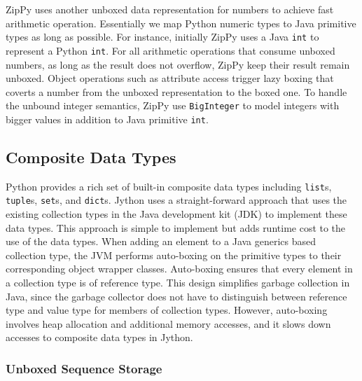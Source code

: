 ZipPy uses another unboxed data representation for numbers to achieve fast arithmetic operation.
Essentially we map Python numeric types to Java primitive types as long as possible.
For instance, initially ZipPy uses a Java \texttt{int} to represent a Python \texttt{int}.
For all arithmetic operations that consume unboxed numbers, as long as the result does not overflow, ZipPy keep their result remain unboxed.
Object operations such as attribute access trigger lazy boxing that coverts a number from the unboxed representation to the boxed one.
To handle the unbound integer semantics, ZipPy use \texttt{BigInteger} to model integers with bigger values in addition to Java primitive \texttt{int}.

\subsection{Composite Data Types}

Python provides a rich set of built-in composite data types including \texttt{list}s, \texttt{tuple}s, \texttt{set}s, and \texttt{dict}s.
Jython uses a straight-forward approach that uses the existing collection types in the Java development kit (JDK) to implement these data types.
This approach is simple to implement but adds runtime cost to the use of the data types.
When adding an element to a Java generics based collection type, the JVM performs auto-boxing on the primitive types to their corresponding object wrapper classes.
Auto-boxing ensures that every element in a collection type is of reference type.
This design simplifies garbage collection in Java, since the garbage collector does not have to distinguish between reference type and value type for members of collection types.
However, auto-boxing involves heap allocation and additional memory accesses, and it slows down accesses to composite data types in Jython.

\subsubsection{Unboxed Sequence Storage}

